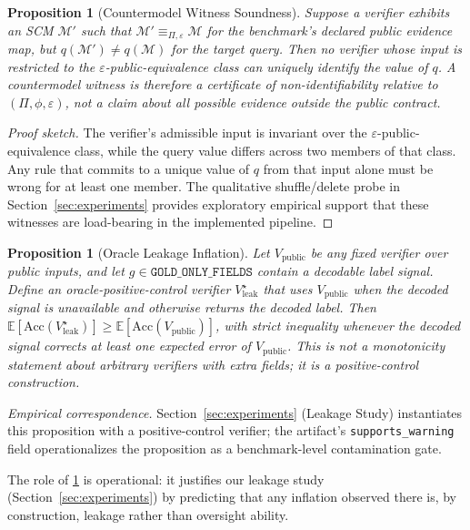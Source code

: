 \documentclass{article}
\theoremstyle{plain}
\newtheorem{proposition}[theorem]{Proposition}
\theoremstyle{definition}
\theoremstyle{remark}
\begin{document}
\begin{proposition}[Countermodel Witness Soundness]
\label{prop:witness}
Suppose a verifier exhibits an SCM $\mathcal{M}'$ such that
$\mathcal{M}' \equiv_{\Pi,\varepsilon} \mathcal{M}$ for the benchmark's
declared public evidence map, but $q(\mathcal{M}') \neq q(\mathcal{M})$ for
the target query. Then no verifier whose input is restricted to the
$\varepsilon$-public-equivalence class can uniquely identify the value of
$q$. A countermodel witness is therefore a certificate of non-identifiability
relative to $(\Pi,\phi,\varepsilon)$, not a claim about all possible evidence
outside the public contract.
\end{proposition}
\begin{proof}[Proof sketch]
The verifier's admissible input is invariant over the
$\varepsilon$-public-equivalence class, while the query value differs across
two members of that class. Any rule that commits to a unique value of $q$ from
that input alone must be wrong for at least one member. The qualitative
shuffle/delete probe in Section~\ref{sec:experiments} provides exploratory
empirical support that these witnesses are load-bearing in the implemented
pipeline.
\end{proof}

\begin{proposition}[Oracle Leakage Inflation]
\label{prop:leakage}
Let $V_{\text{public}}$ be any fixed verifier over public inputs, and let
$g \in \texttt{GOLD\_ONLY\_FIELDS}$ contain a decodable label signal. Define an
oracle-positive-control verifier $V_{\text{leak}}^\star$ that uses
$V_{\text{public}}$ when the decoded signal is unavailable and otherwise
returns the decoded label. Then
$\mathbb{E}[\text{Acc}(V_{\text{leak}}^\star)] \ge
 \mathbb{E}[\text{Acc}(V_{\text{public}})]$, with strict inequality whenever
the decoded signal corrects at least one expected error of $V_{\text{public}}$.
This is not a monotonicity statement about arbitrary verifiers with extra
fields; it is a positive-control construction.
\end{proposition}

\emph{Empirical correspondence.} Section~\ref{sec:experiments} (Leakage Study)
instantiates this proposition with a positive-control verifier; the artifact's
\texttt{supports\_warning} field operationalizes the proposition as a
benchmark-level contamination gate.

The role of \cref{prop:leakage} is operational: it justifies our leakage
study (Section~\ref{sec:experiments}) by predicting that any inflation
observed there is, by construction, leakage rather than oversight ability.
\end{document}

